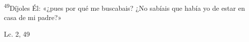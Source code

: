 \documentclass[../../rosario.tex]{subfiles}
\begin{document}
    \textsuperscript{49}Díjoles Él: «¿pues por qué me buscabais? ¿No sabíais que había yo de estar en casa de mi padre?»
    \begin{flushright}
    Lc. 2, 49        
    \end{flushright}
\end{document}

